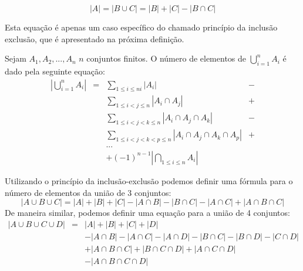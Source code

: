 \[|A| = |B\cup C| = |B| + |C| - |B\cap C|\]

Esta equação é apenas um caso específico do chamado princípio da
inclusão exclusão, que é apresentado na próxima definição.

\begin{Definition}
Sejam $A_1,A_2,...,A_n$ $n$ conjuntos finitos. O número de elementos
de $\bigcup_{i=1}^{n}A_i$ é dado pela seguinte equação:
\[
\begin{array}{lclc}
|\bigcup_{i=1}^nA_i| & = & \sum_{1\leq i \leq ni}|A_i| & - \\
                                &    & \sum_{1\leq i < j \leq
                                  n}|A_i\cap A_j| & + \\
                                &   & \sum_{1\leq i < j < k \leq n}|A_i
                                \cap A_j \cap A_k| & - \\
                                &   & \sum_{1\leq i < j < k < p \leq
                                  n}|A_i \cap A_j \cap A_k \cap A_p| &
                                + \\
                                &   & ... \\
                                &   & + (-1)^{n - 1}|\bigcap_{1\leq
                                  i\leq n} A_i|
\end{array}
\]
\end{Definition}
\begin{Example}
Utilizando o princípio da inclusão-exclusão podemos definir uma
fórmula para o número de elementos da união de 3 conjuntos:
\[
|A\cup B \cup C| = |A| + |B| + |C| - |A\cap B| - |B \cap C| - |A \cap
C| + |A \cap B \cap C|
\]
De maneira similar, podemos definir uma equação para a união de 4
conjuntos:
\[
\begin{array}{lcl}
|A\cup B\cup C \cup D| & = & |A| + |B| + |C| + |D|\\
                                       &    & - |A \cap B| - |A \cap
                                       C| - |A \cap D| - |B \cap C| -
                                       |B \cap D| - |C \cap D| \\
                                       &    & + |A \cap B \cap C| +
                                                    |B \cap C \cap D|
                                                    +
                                                    |A \cap C \cap
                                                    D|\\
                                       &    & - |A\cap B \cap C \cap D|

\end{array}
\]
\end{Example}
